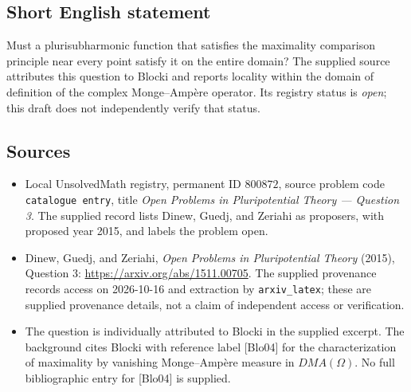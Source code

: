 \documentclass[11pt]{article}
\begin{document}
\subsection{Short English statement}
Must a plurisubharmonic function that satisfies the maximality comparison principle near every point satisfy it on the entire domain? The supplied source attributes this question to Blocki and reports locality within the domain of definition of the complex Monge--Amp\`ere operator. Its registry status is \emph{open}; this draft does not independently verify that status.
\subsection{Sources}
\begin{itemize}
\item Local UnsolvedMath registry, permanent ID \(800872\), source problem code \texttt{catalogue entry}, title \emph{Open Problems in Pluripotential Theory --- Question 3}. The supplied record lists Dinew, Guedj, and Zeriahi as proposers, with proposed year 2015, and labels the problem open.
\item Dinew, Guedj, and Zeriahi, \emph{Open Problems in Pluripotential Theory} (2015), Question 3: \url{https://arxiv.org/abs/1511.00705}. The supplied provenance records access on 2026-10-16 and extraction by \texttt{arxiv\_latex}; these are supplied provenance details, not a claim of independent access or verification.
\item The question is individually attributed to Blocki in the supplied excerpt. The background cites Blocki with reference label [Blo04] for the characterization of maximality by vanishing Monge--Amp\`ere measure in \(DMA(\Omega)\). No full bibliographic entry for [Blo04] is supplied.
\end{itemize}
\end{document}

